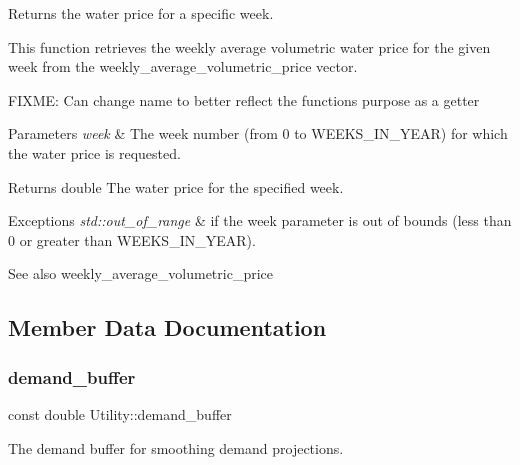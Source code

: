 Returns the water price for a specific week. 

This function retrieves the weekly average volumetric water price for the given week from the weekly\+\_\+average\+\_\+volumetric\+\_\+price vector.

F\+I\+X\+ME\+: Can change name to better reflect the function\textquotesingle{}s purpose as a getter


\begin{DoxyParams}{Parameters}
{\em week} & The week number (from 0 to W\+E\+E\+K\+S\+\_\+\+I\+N\+\_\+\+Y\+E\+AR) for which the water price is requested.\\
\hline
\end{DoxyParams}
\begin{DoxyReturn}{Returns}
double The water price for the specified week.
\end{DoxyReturn}

\begin{DoxyExceptions}{Exceptions}
{\em std\+::out\+\_\+of\+\_\+range} & if the week parameter is out of bounds (less than 0 or greater than W\+E\+E\+K\+S\+\_\+\+I\+N\+\_\+\+Y\+E\+AR).\\
\hline
\end{DoxyExceptions}
\begin{DoxySeeAlso}{See also}
weekly\+\_\+average\+\_\+volumetric\+\_\+price 
\end{DoxySeeAlso}


\subsection{Member Data Documentation}
\mbox{\label{classUtility_a4be9760339ec06e5c932890da8e566b3}} 
\subsubsection{\texorpdfstring{demand\+\_\+buffer}{demand\_buffer}}
{\footnotesize\ttfamily const double Utility\+::demand\+\_\+buffer}



The demand buffer for smoothing demand projections. 

\mbox{\label{classUtility_ad41c4ea5c911c5000452a3371cd65d5f}} 
